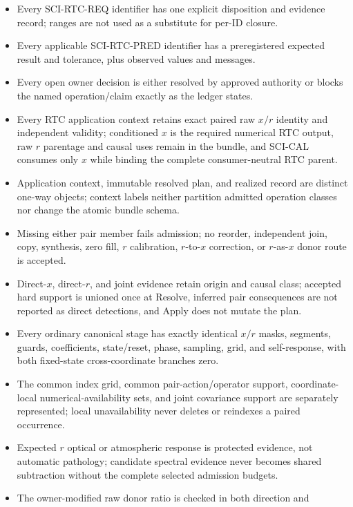 \documentclass[10pt]{article}
\begin{document}
\begin{itemize}
\item Every SCI-RTC-REQ identifier has one explicit disposition and evidence
      record; ranges are not used as a substitute for per-ID closure.
\item Every applicable SCI-RTC-PRED identifier has a preregistered expected
      result and tolerance, plus observed values and messages.
\item Every open owner decision is either resolved by approved authority or
      blocks the named operation/claim exactly as the ledger states.
\item Every RTC application context retains exact paired raw $x/r$ identity and independent
      validity; conditioned $x$ is the required numerical RTC output, raw $r$
      parentage and causal uses remain in the bundle, and SCI-CAL consumes only
      $x$ while binding the complete consumer-neutral RTC parent.
\item Application context, immutable resolved plan, and realized record are
      distinct one-way objects; context labels neither partition admitted
      operation classes nor change the atomic bundle schema.
\item Missing either pair member fails admission; no reorder, independent
      join, copy, synthesis, zero fill, $r$ calibration, $r$-to-$x$
      correction, or $r$-as-$x$ donor route is accepted.
\item Direct-$x$, direct-$r$, and joint evidence retain origin and causal
      class; accepted hard support is unioned once at Resolve, inferred pair
      consequences are not reported as direct detections, and Apply does not
      mutate the plan.
\item Every ordinary canonical stage has exactly identical $x/r$ masks,
      segments, guards, coefficients, state/reset, phase, sampling, grid, and
      self-response, with both fixed-state cross-coordinate branches zero.
\item The common index grid, common pair-action/operator support,
      coordinate-local numerical-availability sets, and joint covariance
      support are separately represented; local unavailability never deletes
      or reindexes a paired occurrence.
\item Expected $r$ optical or atmospheric response is protected evidence, not
      automatic pathology; candidate spectral evidence never becomes shared
      subtraction without the complete selected admission budgets.
\item The owner-modified raw donor ratio is checked in both direction and

\end{itemize}
\end{document}
